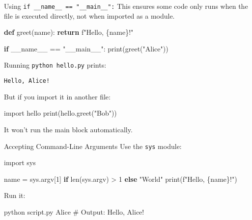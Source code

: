 \documentclass[
  letterpaper,
  DIV=11,
  numbers=noendperiod]{scrreprt}
\newenvironment{Shaded}{\begin{snugshade}}{\end{snugshade}}
\newcommand{\BuiltInTok}[1]{\textcolor[rgb]{0.00,0.23,0.31}{#1}}
\newcommand{\CommentTok}[1]{\textcolor[rgb]{0.37,0.37,0.37}{#1}}
\newcommand{\ControlFlowTok}[1]{\textcolor[rgb]{0.00,0.23,0.31}{\textbf{#1}}}
\newcommand{\DecValTok}[1]{\textcolor[rgb]{0.68,0.00,0.00}{#1}}
\newcommand{\ExtensionTok}[1]{\textcolor[rgb]{0.00,0.23,0.31}{#1}}
\newcommand{\ImportTok}[1]{\textcolor[rgb]{0.00,0.46,0.62}{#1}}
\newcommand{\KeywordTok}[1]{\textcolor[rgb]{0.00,0.23,0.31}{\textbf{#1}}}
\newcommand{\NormalTok}[1]{\textcolor[rgb]{0.00,0.23,0.31}{#1}}
\newcommand{\OperatorTok}[1]{\textcolor[rgb]{0.37,0.37,0.37}{#1}}
\newcommand{\SpecialCharTok}[1]{\textcolor[rgb]{0.37,0.37,0.37}{#1}}
\newcommand{\SpecialStringTok}[1]{\textcolor[rgb]{0.13,0.47,0.30}{#1}}
\newcommand{\StringTok}[1]{\textcolor[rgb]{0.13,0.47,0.30}{#1}}
\newcommand{\VariableTok}[1]{\textcolor[rgb]{0.07,0.07,0.07}{#1}}
\begin{document}
Using \texttt{if\ \_\_name\_\_\ ==\ "\_\_main\_\_":} This ensures some
code only runs when the file is executed directly, not when imported as
a module.

\begin{Shaded}
\begin{Highlighting}[]
\KeywordTok{def}\NormalTok{ greet(name):}
    \ControlFlowTok{return} \SpecialStringTok{f"Hello, }\SpecialCharTok{\{}\NormalTok{name}\SpecialCharTok{\}}\SpecialStringTok{!"}

\ControlFlowTok{if} \VariableTok{\_\_name\_\_} \OperatorTok{==} \StringTok{"\_\_main\_\_"}\NormalTok{:}
    \BuiltInTok{print}\NormalTok{(greet(}\StringTok{"Alice"}\NormalTok{))}
\end{Highlighting}
\end{Shaded}

Running \texttt{python\ hello.py} prints:

\begin{verbatim}
Hello, Alice!
\end{verbatim}

But if you import it in another file:

\begin{Shaded}
\begin{Highlighting}[]
\ImportTok{import}\NormalTok{ hello}
\BuiltInTok{print}\NormalTok{(hello.greet(}\StringTok{"Bob"}\NormalTok{))}
\end{Highlighting}
\end{Shaded}

It won't run the main block automatically.

Accepting Command-Line Arguments Use the \texttt{sys} module:

\begin{Shaded}
\begin{Highlighting}[]
\ImportTok{import}\NormalTok{ sys}

\NormalTok{name }\OperatorTok{=}\NormalTok{ sys.argv[}\DecValTok{1}\NormalTok{] }\ControlFlowTok{if} \BuiltInTok{len}\NormalTok{(sys.argv) }\OperatorTok{\textgreater{}} \DecValTok{1} \ControlFlowTok{else} \StringTok{"World"}
\BuiltInTok{print}\NormalTok{(}\SpecialStringTok{f"Hello, }\SpecialCharTok{\{}\NormalTok{name}\SpecialCharTok{\}}\SpecialStringTok{!"}\NormalTok{)}
\end{Highlighting}
\end{Shaded}

Run it:

\begin{Shaded}
\begin{Highlighting}[]
\ExtensionTok{python}\NormalTok{ script.py Alice}
\CommentTok{\# Output: Hello, Alice!}
\end{Highlighting}
\end{Shaded}
\end{document}

